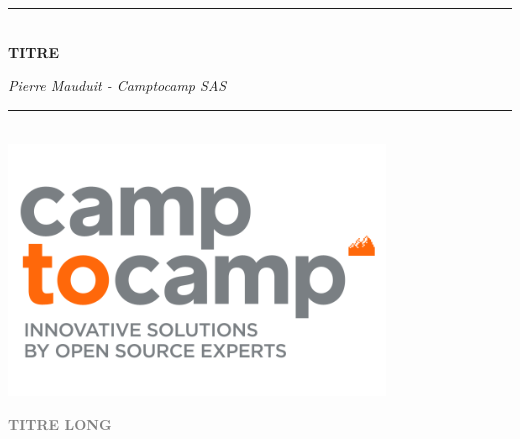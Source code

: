 \documentclass[11pt,a4paper]{article}
\newcommand{\HRule}{\rule{\linewidth}{0.5mm}}
\begin{document}
\begin{titlepage}

\begin{center}

\color{orange}\HRule \\[1.5cm]

{\color{orange} \huge \bfseries TITRE}\\[1.5cm]

\end{center}


\begin{flushright}

{ \color{orange} \it  Pierre Mauduit - Camptocamp SAS}

\end{flushright}

\begin{center}
\color{orange}\HRule  \\[4cm]
\includegraphics[width=10cm]{./ressources/logo-big.png}
\end{center}

\end{titlepage}



\fancyhf{}

\fancyhf[FL]{\small{\textcolor{Gray}{INFO BAS GAUCHE}}}
\fancyhf[FR]{\small{\textcolor{Gray}{INFO BAS DROITE}}}



\begin{flushright}
  \textbf {\LARGE {\textcolor{Gray}{TITRE LONG}}}
\end{flushright}

\section*{}
\end{document}
